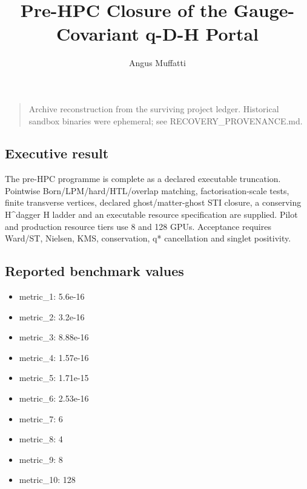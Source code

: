 \documentclass[
]{article}
\title{Pre-HPC Closure of the Gauge-Covariant q-D-H Portal}
\author{Angus Muffatti}
\date{}
\providecommand{\tightlist}{%
  \setlength{\itemsep}{0pt}\setlength{\parskip}{0pt}}
\begin{document}
\maketitle

\begin{quote}
Archive reconstruction from the surviving project ledger. Historical
sandbox binaries were ephemeral; see RECOVERY\_PROVENANCE.md.
\end{quote}

\hypertarget{executive-result}{%
\subsection{Executive result}\label{executive-result}}

The pre-HPC programme is complete as a declared executable truncation.
Pointwise Born/LPM/hard/HTL/overlap matching, factorisation-scale tests,
finite transverse vertices, declared ghost/matter-ghost STI closure, a
conserving H\^{}dagger H ladder and an executable resource specification
are supplied. Pilot and production resource tiers use 8 and 128 GPUs.
Acceptance requires Ward/ST, Nielsen, KMS, conservation, q* cancellation
and singlet positivity.

\hypertarget{reported-benchmark-values}{%
\subsection{Reported benchmark values}\label{reported-benchmark-values}}

\begin{itemize}
\tightlist
\item
  metric\_1: 5.6e-16
\item
  metric\_2: 3.2e-16
\item
  metric\_3: 8.88e-16
\item
  metric\_4: 1.57e-16
\item
  metric\_5: 1.71e-15
\item
  metric\_6: 2.53e-16
\item
  metric\_7: 6
\item
  metric\_8: 4
\item
  metric\_9: 8
\item
  metric\_10: 128
\end{itemize}
\end{document}
